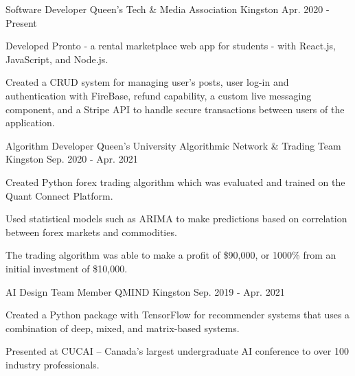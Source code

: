 

\begin{cventries}

  \cventry
    {Software Developer} %
    {Queen’s Tech \& Media Association} %
    {Kingston} %
    {Apr. 2020 - Present} %
    {
      \begin{cvitems} %
        \item {Developed Pronto - a rental marketplace web app for students - with React.js, JavaScript, and Node.js.}
        \item {Created a CRUD system for managing user’s posts, user log-in and authentication with FireBase, refund capability, a custom live messaging component, and a Stripe API to handle secure transactions between users of the application.}
      \end{cvitems}
    }

  \cventry
    {Algorithm Developer} %
    {Queen's University Algorithmic Network \& Trading Team} %
    {Kingston} %
    {Sep. 2020 - Apr. 2021} %
    {
      \begin{cvitems} %
        \item {Created Python forex trading algorithm which was evaluated and trained on the Quant Connect Platform.}
        \item {Used statistical models such as ARIMA to make predictions based on correlation between forex markets and commodities.}
        \item {The trading algorithm was able to make a profit of \$90,000, or 1000\% from an initial investment of \$10,000.}
      \end{cvitems}
    }

  \cventry
    {AI Design Team Member} %
    {QMIND} %
    {Kingston} %
    {Sep. 2019 - Apr. 2021} %
    {
      \begin{cvitems} %
        \item {Created a Python package with TensorFlow for recommender systems that uses a combination of deep, mixed, and matrix-based systems.}
        \item {Presented at CUCAI – Canada’s largest undergraduate AI conference to over 100 industry professionals.}
      \end{cvitems}
    }


\end{cventries}
